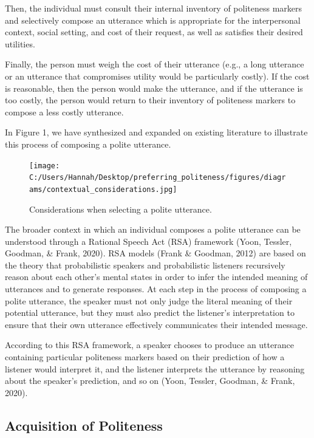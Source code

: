 \documentclass[
  english,
  man,floatsintext]{apa6}
\begin{document}
Then, the individual must consult their internal inventory of politeness markers and selectively compose an utterance which is appropriate for the interpersonal context, social setting, and cost of their request, as well as satisfies their desired utilities.

Finally, the person must weigh the cost of their utterance (e.g., a long utterance or an utterance that compromises utility would be particularly costly). If the cost is reasonable, then the person would make the utterance, and if the utterance is too costly, the person would return to their inventory of politeness markers to compose a less costly utterance.

In Figure 1, we have synthesized and expanded on existing literature to illustrate this process of composing a polite utterance.

\begin{figure}
\centering
\texttt{[image: C:/Users/Hannah/Desktop/preferring\_politeness/figures/diagrams/contextual\_considerations.jpg]}
\caption{Considerations when selecting a polite utterance.}
\end{figure}

The broader context in which an individual composes a polite utterance can be understood through a Rational Speech Act (RSA) framework (Yoon, Tessler, Goodman, \& Frank, 2020). RSA models (Frank \& Goodman, 2012) are based on the theory that probabilistic speakers and probabilistic listeners recursively reason about each other's mental states in order to infer the intended meaning of utterances and to generate responses. At each step in the process of composing a polite utterance, the speaker must not only judge the literal meaning of their potential utterance, but they must also predict the listener's interpretation to ensure that their own utterance effectively communicates their intended message.

According to this RSA framework, a speaker chooses to produce an utterance containing particular politeness markers based on their prediction of how a listener would interpret it, and the listener interprets the utterance by reasoning about the speaker's prediction, and so on (Yoon, Tessler, Goodman, \& Frank, 2020).

\hypertarget{acquisition-of-politeness}{%
\subsection{Acquisition of Politeness}\label{acquisition-of-politeness}}
\end{document}
